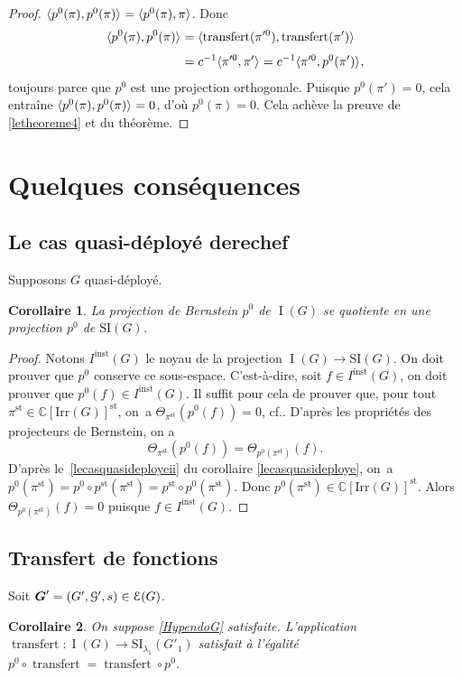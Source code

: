 \documentclass[11pt]{article}
\newcommand{\cf}{cf.\xspace}
\numberwithin{equation}{section}\providecommand{\og}{«\,}\providecommand{\fg}{\,»}
\let\mathcal \EuScript
\newcommand{\NoChangel}[1]{%
\expandafter\let\csname old\string#1\endcsname=#1
\let#1=\relax
\newcommand{#1}{\mathcode`l="716C\csname old\string#1\endcsname\mathcode`l="7160 }%
}
\let\<\langle
\let\>\rangle
\newcommand{\rell}{\mathrm{ell}} \NoChangel{\rell}
\newcommand{\inst}{\mathrm{inst}}
\newcommand{\Irr}{\mathrm{Irr}}
\newcommand{\SI}{\mathrm{SI}}
\newcommand{\st}{\mathrm{st}}
\DeclareMathOperator{\rI}{I}
\DeclareMathOperator{\transfert}{transfert}
\newcommand{\bG}{\boldsymbol{G}}
\newcommand{\cE}{\mathcal{E}}
\newcommand{\cG}{\mathcal{G}}
\newcommand{\CC}{\mathbb{C}}
\theoremstyle{plain}
\newtheorem*{cor*}{Corollaire}
\theoremstyle{definition}
\begin{document}
\begin{proof}
$\<p^0(\pi),p^0(\pi)\>_{\rell}=\<p^0(\pi),\pi\>_{\rell}$. Donc
\begin{align*}
\<p^0(\pi),p^0(\pi)\>_{\rell}&=\<\transfert_{\rell}(\pi^{\prime0}),\transfert_{\rell}(\pi')\>_{\rell}\\
&=c^{-1}\<\pi^{\prime0},\pi'\>_{\rell}=c^{-1}\<\pi^{\prime0},p^0(\pi')\>_{\rell},
\end{align*}
toujours parce que $p^0$ est une projection orthogonale. Puisque $p^0(\pi')=0$, cela entraîne
$\<p^0(\pi),p^0(\pi)\>_{\rell}=0$, d'où $p^0(\pi)=0$. Cela achève la preuve de \eqref{letheoreme4} et du théorème.
\end{proof}

\section{Quelques conséquences}

\subsection{Le cas quasi-déployé derechef}\label{derechef}
Supposons $G$ quasi-déployé.
\begin{cor*}
La projection de Bernstein $p^0$ de $\rI(G)$ se quotiente en une projection $p^0$ de $\SI(G)$.
\end{cor*}

\begin{proof}
Notons $I^{\inst}(G)$ le noyau de la projection $\rI(G)\to \SI(G)$. On doit prouver que $p^0$ conserve ce sous-espace. C'est-à-dire, soit $f\in I^{\inst}(G)$, on doit prouver que $p^0(f)\in I^{\inst}(G)$. Il suffit pour cela de prouver que, pour tout $\pi^{\st}\in \CC[\Irr(G)]^{\st}$, on~a $\Theta_{\pi^{\st}}(p^0(f))=0$, \cf \cite[Cor.\,XI.5.2(i)]{MW}. D'après les propriétés des projecteurs de Bernstein, on a
\[
\Theta_{\pi^{\st}}(p^0(f))=\Theta_{p^0(\pi^{\st})}(f).
\]
D'après le~\eqref{lecasquasideployeii} du corollaire \ref{lecasquasideploye}, on~a $p^0(\pi^{\st})=p^0\circ p^{\st}(\pi^{\st})=p^{\st}\circ p^0(\pi^{\st})$. Donc $p^0(\pi^{\st})\in \CC[\Irr(G)]^{\st}$. Alors $\Theta_{p^0(\pi^{\st})}(f)=0$ puisque $f\in I^{\inst}(G)$.
\end{proof}

\subsection{Transfert de fonctions}\label{transfertdefonctions}
Soit $\bG'=(G',\cG',s)\in \cE(G)$.
\begin{cor*}
On suppose \ref{HypendoG} satisfaite. L'application $\transfert:\rI(G)\to \SI_{\lambda_{1}}(G'_{1})$ satisfait à l'égalité $p^0\circ \transfert=\transfert\circ p^0$.
\end{cor*}
\end{document}
